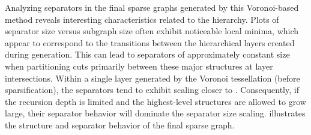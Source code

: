 Analyzing separators in the final sparse graphs generated by this Voronoi-based method reveals interesting characteristics related to the hierarchy.
Plots of separator size versus subgraph size often exhibit noticeable local minima, which appear to correspond to the transitions between the hierarchical layers created during generation.
This can lead to separators of approximately constant size when partitioning cuts primarily between these major structures at layer intersections.
Within a single layer generated by the Voronoi tessellation (before sparsification), the separators tend to exhibit scaling closer to .
Consequently, if the recursion depth is limited and the highest-level structures are allowed to grow large, their  separator behavior will dominate the separator size scaling.
 illustrates the structure and separator behavior of the final sparse graph.

